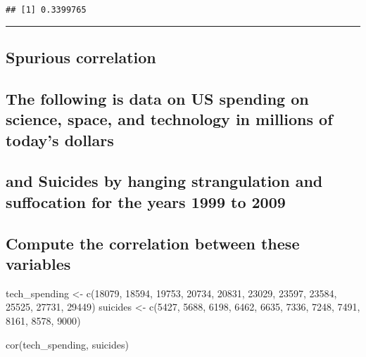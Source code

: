 \documentclass[
]{article}
\newenvironment{Shaded}{\begin{snugshade}}{\end{snugshade}}
\newcommand{\DecValTok}[1]{\textcolor[rgb]{0.00,0.00,0.81}{#1}}
\newcommand{\FunctionTok}[1]{\textcolor[rgb]{0.00,0.00,0.00}{#1}}
\newcommand{\NormalTok}[1]{#1}
\newcommand{\OtherTok}[1]{\textcolor[rgb]{0.56,0.35,0.01}{#1}}
\begin{document}
\begin{verbatim}
## [1] 0.3399765
\end{verbatim}

\begin{center}\rule{0.5\linewidth}{0.5pt}\end{center}

\hypertarget{spurious-correlation}{%
\subsection{Spurious correlation}\label{spurious-correlation}}

\hypertarget{the-following-is-data-on-us-spending-on-science-space-and-technology-in-millions-of-todays-dollars}{%
\subsection{The following is data on US spending on science, space, and
technology in millions of today's
dollars}\label{the-following-is-data-on-us-spending-on-science-space-and-technology-in-millions-of-todays-dollars}}

\hypertarget{and-suicides-by-hanging-strangulation-and-suffocation-for-the-years-1999-to-2009}{%
\subsection{and Suicides by hanging strangulation and suffocation for
the years 1999 to
2009}\label{and-suicides-by-hanging-strangulation-and-suffocation-for-the-years-1999-to-2009}}

\hypertarget{compute-the-correlation-between-these-variables}{%
\subsection{Compute the correlation between these
variables}\label{compute-the-correlation-between-these-variables}}

\begin{Shaded}
\begin{Highlighting}[]
\NormalTok{tech\_spending }\OtherTok{\textless{}{-}} \FunctionTok{c}\NormalTok{(}\DecValTok{18079}\NormalTok{, }\DecValTok{18594}\NormalTok{, }\DecValTok{19753}\NormalTok{, }\DecValTok{20734}\NormalTok{, }\DecValTok{20831}\NormalTok{, }\DecValTok{23029}\NormalTok{, }\DecValTok{23597}\NormalTok{, }\DecValTok{23584}\NormalTok{, }\DecValTok{25525}\NormalTok{, }\DecValTok{27731}\NormalTok{, }\DecValTok{29449}\NormalTok{)}
\NormalTok{suicides }\OtherTok{\textless{}{-}} \FunctionTok{c}\NormalTok{(}\DecValTok{5427}\NormalTok{, }\DecValTok{5688}\NormalTok{, }\DecValTok{6198}\NormalTok{, }\DecValTok{6462}\NormalTok{, }\DecValTok{6635}\NormalTok{, }\DecValTok{7336}\NormalTok{, }\DecValTok{7248}\NormalTok{, }\DecValTok{7491}\NormalTok{, }\DecValTok{8161}\NormalTok{, }\DecValTok{8578}\NormalTok{, }\DecValTok{9000}\NormalTok{)}

\FunctionTok{cor}\NormalTok{(tech\_spending, suicides)}
\end{Highlighting}
\end{Shaded}
\end{document}
